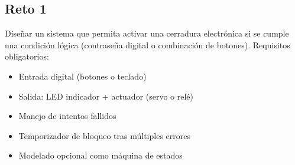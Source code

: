
\subsection{\textbf{Reto 1}} %
Diseñar un sistema que permita activar una cerradura electrónica si se cumple una condición lógica (contraseña digital o combinación de botones). Requisitos obligatorios:
\begin{itemize}
    \item Entrada digital (botones o teclado)
    \item Salida: LED indicador + actuador (servo o relé)
    \item Manejo de intentos fallidos
    \item Temporizador de bloqueo tras múltiples errores
    \item Modelado opcional como máquina de estados
\end{itemize}
\vspace{0,3cm}
